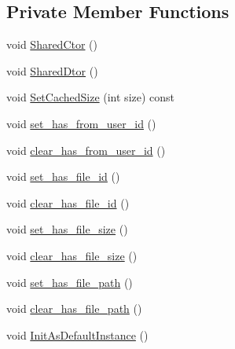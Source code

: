 \subsection*{Private Member Functions}
\begin{DoxyCompactItemize}
\item 
void \hyperlink{class_i_m_1_1_base_define_1_1_client_offline_file_info_a0c65feccd50bd066df97bb10d808236a}{Shared\+Ctor} ()
\item 
void \hyperlink{class_i_m_1_1_base_define_1_1_client_offline_file_info_a0d568fe4b4e296ae2c5f5708be32d761}{Shared\+Dtor} ()
\item 
void \hyperlink{class_i_m_1_1_base_define_1_1_client_offline_file_info_a4a97f1863e3ea061b8387b55757c05ae}{Set\+Cached\+Size} (int size) const 
\item 
void \hyperlink{class_i_m_1_1_base_define_1_1_client_offline_file_info_aab68ca79c2bcc89d68b84d1e79ec9e9f}{set\+\_\+has\+\_\+from\+\_\+user\+\_\+id} ()
\item 
void \hyperlink{class_i_m_1_1_base_define_1_1_client_offline_file_info_a8fdb6d7610bc6280bf3509994097c5d1}{clear\+\_\+has\+\_\+from\+\_\+user\+\_\+id} ()
\item 
void \hyperlink{class_i_m_1_1_base_define_1_1_client_offline_file_info_ab6cf4e23ea182b694049f25c22922654}{set\+\_\+has\+\_\+file\+\_\+id} ()
\item 
void \hyperlink{class_i_m_1_1_base_define_1_1_client_offline_file_info_ae8cedfb8f78cfc6e190038f81ffd4e1e}{clear\+\_\+has\+\_\+file\+\_\+id} ()
\item 
void \hyperlink{class_i_m_1_1_base_define_1_1_client_offline_file_info_a9d5ef7c74b980a2827cb98782ce21ae6}{set\+\_\+has\+\_\+file\+\_\+size} ()
\item 
void \hyperlink{class_i_m_1_1_base_define_1_1_client_offline_file_info_abdfcd4d590687f8d0af3a52f446c5e37}{clear\+\_\+has\+\_\+file\+\_\+size} ()
\item 
void \hyperlink{class_i_m_1_1_base_define_1_1_client_offline_file_info_af5b019a9e766df61d3d8eb6095da202b}{set\+\_\+has\+\_\+file\+\_\+path} ()
\item 
void \hyperlink{class_i_m_1_1_base_define_1_1_client_offline_file_info_ae3591d3971291534880060b4a26f9689}{clear\+\_\+has\+\_\+file\+\_\+path} ()
\item 
void \hyperlink{class_i_m_1_1_base_define_1_1_client_offline_file_info_a010dca0d32f0a72d0011ad9cf92523bf}{Init\+As\+Default\+Instance} ()
\end{DoxyCompactItemize}
